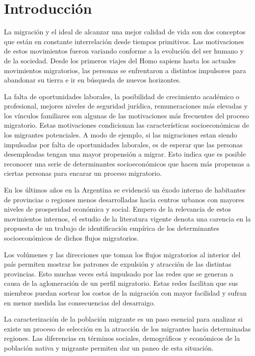 \documentclass[12pt,a4paper]{article}
\begin{document}
\section{Introducción}

La migración y el ideal de alcanzar una mejor calidad de vida son dos conceptos que están en constante interrelación desde tiempos primitivos. Las motivaciones de estos movimientos fueron variando conforme a la evolución del ser humano y de la sociedad. Desde los primeros viajes del Homo sapiens hasta los actuales movimientos migratorios, las personas se enfrentaron a distintos impulsores para abandonar su tierra e ir en búsqueda de nuevos horizontes. 

La falta de oportunidades laborales, la posibilidad de crecimiento académico o profesional, mejores niveles de seguridad jurídica, remuneraciones más elevadas y los vínculos familiares son algunas de las motivaciones más frecuentes del proceso migratorio. Estas motivaciones condicionan las características socioeconómicas de los migrantes potenciales. A modo de ejemplo, si las migraciones estan siendo impulsadas por falta de oportunidades laborales, es de esperar que las personas desempleadas tengan una mayor propensión a migrar. Esto indica que es posible reconocer una serie de determinantes socioeconómicos que hacen más propensas a ciertas personas para encarar un proceso migratorio. 

En los últimos años en la Argentina se evidenció un éxodo interno de habitantes de provincias o regiones menos desarrolladas hacia centros urbanos con mayores niveles de prosperidad económica y social. Empero de la relevancia de estos movimientos internos, el estudio de la literatura vigente denota una carencia en la propuesta de un trabajo de identificación empírica de los determinantes socioeconómicos de dichos flujos migratorios.

Los volúmenes y las direcciones que toman los flujos migratorios al interior del país permiten mostrar los patrones de expulsión y atracción de las distintas provincias. Esto muchas veces está impulsado por las redes que se generan a causa de la aglomeración de un perfil migratorio. Estas redes facilitan que sus miembros puedan sortear los costos de la migración con mayor facilidad y sufran en menor medida las consecuencias del desarraigo.

La caracterización de la población migrante es un paso esencial para analizar si existe un proceso de selección en la atracción de los migrantes hacia determinadas regiones. Las diferencias en términos sociales, demográficos y económicos de la población nativa y migrante permiten dar un paneo de esta situación.
\end{document}
